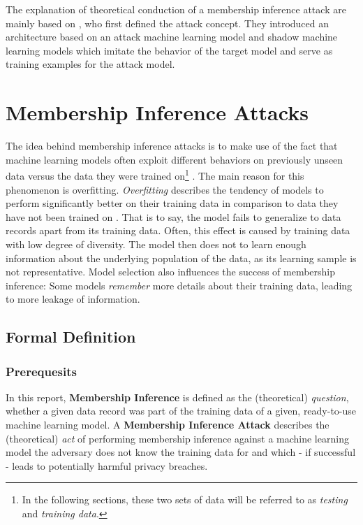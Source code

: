 \documentclass[runningheads]{llncs}
\begin{document}
The explanation of theoretical conduction of a membership inference attack are mainly based on \cite{shokri2017membership}, who first defined the attack concept. They introduced an architecture based on an attack machine learning model and shadow machine learning models which imitate the behavior of the target model and serve as training examples for the attack model.

\section{Membership Inference Attacks}

The idea behind membership inference attacks is to make use of the fact that machine learning models often exploit different behaviors on previously unseen data versus the data they were trained on\footnote{In the following sections, these two sets of data will be referred to as \textit{testing} and \textit{training data}.} \cite{shokri2017membership}. The main reason for this phenomenon is overfitting. \textit{Overfitting} describes the tendency of models to perform significantly better on their training data in comparison to data they have not been trained on \cite{weigend1994overfitting}. That is to say, the model fails to generalize to data records apart from its training data. Often, this effect is caused by training data with low degree of diversity. The model then does not to learn enough information about the underlying population of the data, as its learning sample is not representative. 
Model selection also influences the success of membership inference: Some models \textit{remember} more details about their training data, leading to more leakage of information.

\subsection{Formal Definition}

\subsubsection{Prerequesits}
In this report, \textbf{Membership Inference} is defined as the (theoretical) \textit{question}, whether a given data record was part of the training data of a given, ready-to-use machine learning model. A \textbf{Membership Inference Attack} describes the (theoretical) \textit{act} of performing membership inference against a machine learning model the adversary does not know the training data for and which - if successful - leads to potentially harmful privacy breaches.
\end{document}
